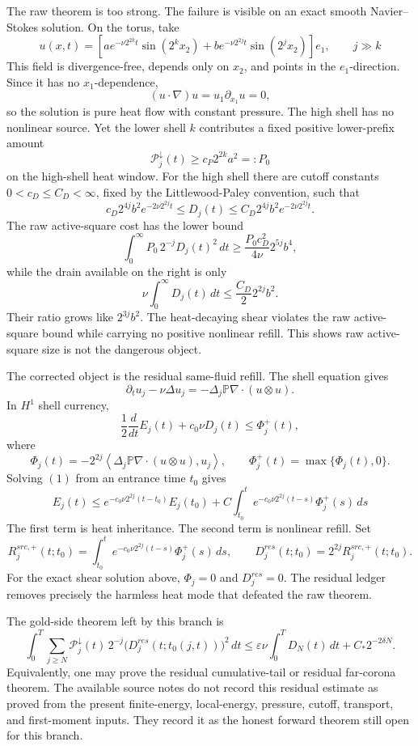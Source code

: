 The raw theorem is too strong.  The failure is visible on an exact smooth
Navier--Stokes solution.  On the torus, take
\[
  u(x,t)
  =
  \left[
    a e^{-\nu2^{2k}t}\sin(2^kx_2)
    +
    b e^{-\nu2^{2j}t}\sin(2^jx_2)
  \right]e_1,
  \qquad j\gg k
\]
This field is divergence-free, depends only on \(x_2\), and points in the
\(e_1\)-direction.  Since it has no \(x_1\)-dependence,
\[
  (u\cdot\nabla)u=u_1\partial_{x_1}u=0,
\]
so the solution is pure heat flow with constant pressure.  The high shell
has no nonlinear source.  Yet the lower shell \(k\) contributes a fixed
positive lower-prefix amount
\[
  \mathcal P_j^\downarrow(t)\ge c_P2^{2k}a^2=:P_0
\]
on the high-shell heat window.  For the high shell there are cutoff constants
\(0<c_D\le C_D<\infty\), fixed by the Littlewood-Paley convention, such that
\[
  c_D2^{4j}b^2e^{-2\nu2^{2j}t}
  \le D_j(t)\le
  C_D2^{4j}b^2e^{-2\nu2^{2j}t}.
\]
The raw active-square cost has the lower bound
\[
  \int_0^\infty
  P_0\,2^{-j}D_j(t)^2\,dt
  \ge
  \frac{P_0c_D^2}{4\nu}2^{5j}b^4,
\]
while the drain available on the right is only
\[
  \nu\int_0^\infty D_j(t)\,dt
  \le
  \frac{C_D}{2}2^{2j}b^2.
\]
Their ratio grows like \(2^{3j}b^2\).  The heat-decaying shear violates the
raw active-square bound while carrying no positive nonlinear refill.  This shows
raw active-square size is not the dangerous object.

The corrected object is the residual same-fluid refill.  The shell equation
gives
\[
  \partial_t u_j-\nu\Delta u_j
  =
  -\Delta_j\mathbb P\nabla\cdot(u\otimes u).
\]
In \(H^1\) shell currency,
\[
  \frac12\frac{d}{dt}E_j(t)+c_0\nu D_j(t)
  \le
  \Phi_j^+(t),
  \tag{1}
\]
where
\[
  \Phi_j(t)
  =
  -2^{2j}
  \left\langle
  \Delta_j\mathbb P\nabla\cdot(u\otimes u),u_j
  \right\rangle,
  \qquad
  \Phi_j^+(t)=\max\{\Phi_j(t),0\}.
\]
Solving \((1)\) from an entrance time \(t_0\) gives
\[
  E_j(t)
  \le
  e^{-c_0\nu2^{2j}(t-t_0)}E_j(t_0)
  +
  C\int_{t_0}^t
  e^{-c_0\nu2^{2j}(t-s)}\Phi_j^+(s)\,ds
\]
The first term is heat inheritance.  The second term is nonlinear refill.
Set
\[
  R_j^{src,+}(t;t_0)
  =
  \int_{t_0}^t
  e^{-c_0\nu2^{2j}(t-s)}\Phi_j^+(s)\,ds,
  \qquad
  D_j^{res}(t;t_0)=2^{2j}R_j^{src,+}(t;t_0).
\]
For the exact shear solution above, \(\Phi_j=0\) and
\(D_j^{res}=0\).  The residual ledger removes precisely the harmless heat
mode that defeated the raw theorem.

The gold-side theorem left by this branch is
\[
  \int_0^T
  \sum_{j\ge N}
  \mathcal P_j^\downarrow(t)\,
  2^{-j}
  \bigl(D_j^{res}(t;t_0(j,t))\bigr)^2\,dt
  \le
  \varepsilon\nu\int_0^T D_N(t)\,dt
  +C_*2^{-2\delta N}.
  \tag{R-LPAS}
\]
Equivalently, one may prove the residual cumulative-tail or residual
far-corona theorem.  The available source notes do not record this residual
estimate as proved from the present finite-energy, local-energy, pressure,
cutoff, transport, and first-moment inputs.  They record it as the honest
forward theorem still open for this branch.

